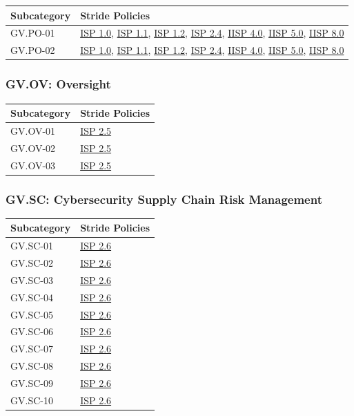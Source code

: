 \documentclass[11pt,landscape]{article}
\begin{document}
\begin{tabularx}{\textwidth}{|p{3.5cm}|X|}
\hline
\rowcolor{headgray} \textbf{Subcategory} & \textbf{Stride Policies} \\
\hline
GV.PO-01 & \hyperref[pol:ISP10]{ISP 1.0}, \hyperref[pol:ISP11]{ISP 1.1}, \hyperref[pol:ISP12]{ISP 1.2}, \hyperref[pol:ISP24]{ISP 2.4}, \hyperref[pol:IISP40]{IISP 4.0}, \hyperref[pol:IISP50]{IISP 5.0}, \hyperref[pol:IISP80]{IISP 8.0} \\
\hline
GV.PO-02 & \hyperref[pol:ISP10]{ISP 1.0}, \hyperref[pol:ISP11]{ISP 1.1}, \hyperref[pol:ISP12]{ISP 1.2}, \hyperref[pol:ISP24]{ISP 2.4}, \hyperref[pol:IISP40]{IISP 4.0}, \hyperref[pol:IISP50]{IISP 5.0}, \hyperref[pol:IISP80]{IISP 8.0} \\
\hline
\end{tabularx}

\subsubsection{GV.OV: Oversight}

\begin{tabularx}{\textwidth}{|p{3.5cm}|X|}
\hline
\rowcolor{headgray} \textbf{Subcategory} & \textbf{Stride Policies} \\
\hline
GV.OV-01 & \hyperref[pol:ISP25]{ISP 2.5} \\
\hline
GV.OV-02 & \hyperref[pol:ISP25]{ISP 2.5} \\
\hline
GV.OV-03 & \hyperref[pol:ISP25]{ISP 2.5} \\
\hline
\end{tabularx}

\subsubsection{GV.SC: Cybersecurity Supply Chain Risk Management}

\begin{tabularx}{\textwidth}{|p{3.5cm}|X|}
\hline
\rowcolor{headgray} \textbf{Subcategory} & \textbf{Stride Policies} \\
\hline
GV.SC-01 & \hyperref[pol:ISP26]{ISP 2.6} \\
\hline
GV.SC-02 & \hyperref[pol:ISP26]{ISP 2.6} \\
\hline
GV.SC-03 & \hyperref[pol:ISP26]{ISP 2.6} \\
\hline
GV.SC-04 & \hyperref[pol:ISP26]{ISP 2.6} \\
\hline
GV.SC-05 & \hyperref[pol:ISP26]{ISP 2.6} \\
\hline
GV.SC-06 & \hyperref[pol:ISP26]{ISP 2.6} \\
\hline
GV.SC-07 & \hyperref[pol:ISP26]{ISP 2.6} \\
\hline
GV.SC-08 & \hyperref[pol:ISP26]{ISP 2.6} \\
\hline
GV.SC-09 & \hyperref[pol:ISP26]{ISP 2.6} \\
\hline
GV.SC-10 & \hyperref[pol:ISP26]{ISP 2.6} \\
\hline
\end{tabularx}
\end{document}
